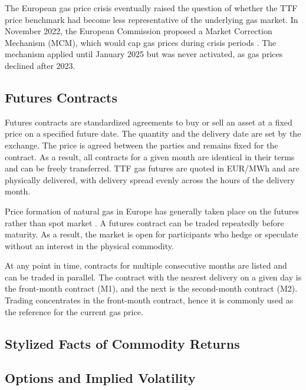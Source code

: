 The European gas price crisis eventually raised the question of whether the TTF price benchmark had become less representative of the underlying gas market. In November 2022, the European Commission proposed a Market Correction Mechanism (MCM), which would cap gas prices during crisis periods \parencite{MCM-euro-commision}. The mechanism applied until January 2025 but was never activated, as gas prices declined after 2023.

\subsection{Futures Contracts}
Futures contracts are standardized agreements to buy or sell an asset at
a fixed price on a specified future date. 
The quantity and the delivery date are set by the exchange. The price is agreed between the parties and remains fixed for the contract. As a result, all contracts for a given month are identical in their terms and can be freely transferred. TTF gas futures are quoted in EUR/MWh and are physically delivered, with delivery spread evenly across the hours of the delivery month. 

Price formation of natural gas in Europe has generally taken place on the futures rather than spot market \parencite{obadiDRIVINGFUNDAMENTALSNATURAL2020}. A futures contract can be traded repeatedly before maturity. As a result, the market is open for participants who hedge or speculate without an interest in the physical commodity.

At any point in time, contracts for multiple consecutive months are listed and can be traded in parallel. The contract with the nearest delivery on a given day is the front-month contract (M1), and the next is the second-month contract (M2). Trading concentrates in the front-month contract, hence it is commonly used as the reference for the current gas price.

\subsection{Stylized Facts of Commodity Returns}
\subsection{Options and Implied Volatility}